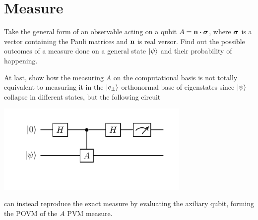 \section{Measure}

{
    Take the general form of an observable acting on a qubit $A = \vb{n}\vdot\vb*{\sigma}$, where $\vb*{\sigma}$ is a vector containing the Pauli matrices and $\vb{n}$ is real versor. Find out the possible outcomes of a measure done on a general state $\ket{\psi}$ and their probability of happening.

    At last, show how the measuring $A$ on the computational basis is not totally equivalent to measuring it in the $\ket{e_\pm}$ orthonormal base of eigenstates since $\ket{\psi}$ collapse in different states, but the following circuit
    \begin{center}
        \includegraphics[width=0.7\textwidth]{Immagini/POVM.pdf}
    \end{center}
    can instead reproduce the exact measure by evaluating the axiliary qubit, forming the POVM of the $A$ PVM measure.
}
